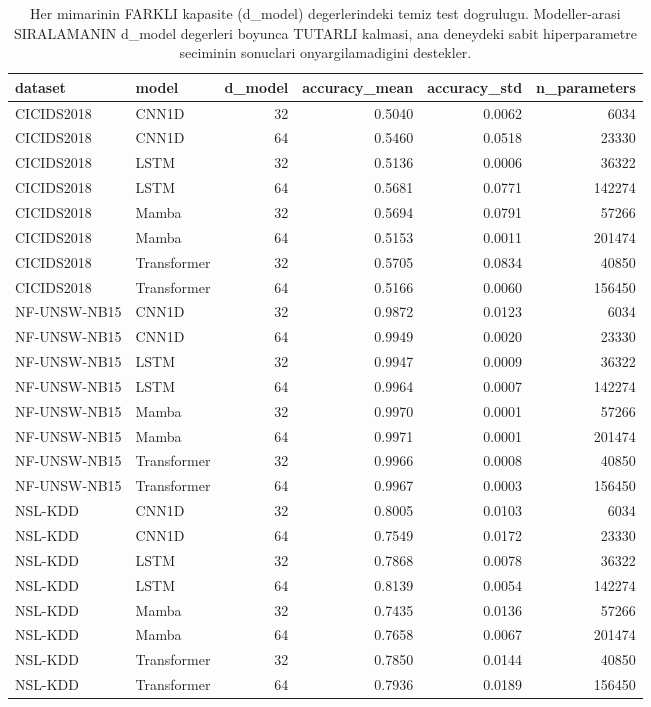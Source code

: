 \begin{table}[ht]
\centering
\caption{Her mimarinin FARKLI kapasite (d_model) degerlerindeki temiz test dogrulugu. Modeller-arasi SIRALAMANIN d_model degerleri boyunca TUTARLI kalmasi, ana deneydeki sabit hiperparametre seciminin sonuclari onyargilamadigini destekler.}
\label{tab:T6_hiperparametre_ablasyonu}
\begin{tabular}{llrrrr}
\toprule
dataset & model & d\_model & accuracy\_mean & accuracy\_std & n\_parameters \\
\midrule
CICIDS2018 & CNN1D & 32 & 0.5040 & 0.0062 & 6034 \\
CICIDS2018 & CNN1D & 64 & 0.5460 & 0.0518 & 23330 \\
CICIDS2018 & LSTM & 32 & 0.5136 & 0.0006 & 36322 \\
CICIDS2018 & LSTM & 64 & 0.5681 & 0.0771 & 142274 \\
CICIDS2018 & Mamba & 32 & 0.5694 & 0.0791 & 57266 \\
CICIDS2018 & Mamba & 64 & 0.5153 & 0.0011 & 201474 \\
CICIDS2018 & Transformer & 32 & 0.5705 & 0.0834 & 40850 \\
CICIDS2018 & Transformer & 64 & 0.5166 & 0.0060 & 156450 \\
NF-UNSW-NB15 & CNN1D & 32 & 0.9872 & 0.0123 & 6034 \\
NF-UNSW-NB15 & CNN1D & 64 & 0.9949 & 0.0020 & 23330 \\
NF-UNSW-NB15 & LSTM & 32 & 0.9947 & 0.0009 & 36322 \\
NF-UNSW-NB15 & LSTM & 64 & 0.9964 & 0.0007 & 142274 \\
NF-UNSW-NB15 & Mamba & 32 & 0.9970 & 0.0001 & 57266 \\
NF-UNSW-NB15 & Mamba & 64 & 0.9971 & 0.0001 & 201474 \\
NF-UNSW-NB15 & Transformer & 32 & 0.9966 & 0.0008 & 40850 \\
NF-UNSW-NB15 & Transformer & 64 & 0.9967 & 0.0003 & 156450 \\
NSL-KDD & CNN1D & 32 & 0.8005 & 0.0103 & 6034 \\
NSL-KDD & CNN1D & 64 & 0.7549 & 0.0172 & 23330 \\
NSL-KDD & LSTM & 32 & 0.7868 & 0.0078 & 36322 \\
NSL-KDD & LSTM & 64 & 0.8139 & 0.0054 & 142274 \\
NSL-KDD & Mamba & 32 & 0.7435 & 0.0136 & 57266 \\
NSL-KDD & Mamba & 64 & 0.7658 & 0.0067 & 201474 \\
NSL-KDD & Transformer & 32 & 0.7850 & 0.0144 & 40850 \\
NSL-KDD & Transformer & 64 & 0.7936 & 0.0189 & 156450 \\
\bottomrule
\end{tabular}

\end{table}
